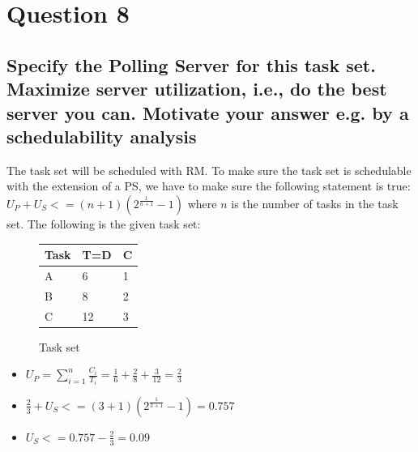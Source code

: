 \section{Question 8}
    \subsection{\textbf{Specify the Polling Server for this task set. Maximize server utilization, i.e., do the best server you can. Motivate your answer e.g. by a schedulability analysis}}

        The task set will be scheduled with RM. To make sure the task set is schedulable with the extension of a PS, we have to make sure the following statement is true: $U_P + U_S <= (n+1)(2^{\frac{1}{n+1}} - 1)$ where $n$ is the number of tasks in the task set. 
        The following is the given task set:

        \renewcommand{\arraystretch}{1.4}
            \begin{figure}[H]
            \centering
            \begin{minipage}{0.5\textwidth}
                \begin{table}[H]
                \centering
                \begin{tabular}{|l|l|l|}
                    \hline
                    \textbf{Task}   & \textbf{T=D}  & \textbf{C}  \\ \hline
                    A               & 6             & 1           \\ \hline
                    B               & 8             & 2           \\ \hline
                    C               & 12            & 3           \\ \hline
                \end{tabular}
                \end{table}
            \end{minipage}%
            \caption{Task set}
            \label{fig:Q8tasks}
            \end{figure}
        \renewcommand{\arraystretch}{1.0}


        \begin{itemize}
            \item $U_P = \sum_{i=1}^{n} \frac{C_i}{T_i} = \frac{1}{6} + \frac{2}{8} + \frac{3}{12} = \frac{2}{3}$
            \item $\frac{2}{3} + U_S <= (3+1)(2^{\frac{1}{3+1}} - 1) = 0.757$
            \item $U_S <= 0.757 - \frac{2}{3} = 0.09$
        \end{itemize}

